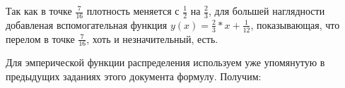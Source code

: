 \documentclass{article}
\begin{document}
\begin{equsation*}
Так как в точке $\frac{7}{16}$ плотность меняется с $\frac{1}{2}$ на $\frac{2}{3}$, для большей
наглядности добавленая вспомогательная функция $y(x) = \frac{2}{3}*x+\frac{1}{12}$,
показывающая, что перелом в точке $\frac{7}{16}$, хоть и незначительный, есть.

Для эмперической функции распределения используем уже упомянутую в предыдущих заданиях этого
документа формулу. Получим:

\begin{figure}[h]
\end{figure}
\end{equsation*}
\end{document}
